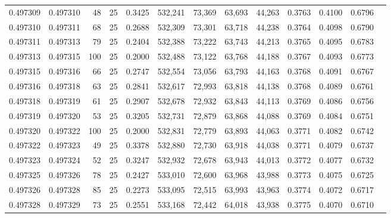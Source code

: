 \begin{tabular}{rrrrrrrrrrrrr}
0.497309 & 0.497310 &    48 &  25 &                                     0.3425 & 532,241 &  73,369 &  63,693 &  44,263 & 0.3763 & 0.4100 & 0.6796 \\
0.497310 & 0.497311 &    68 &  25 &                                     0.2688 & 532,309 &  73,301 &  63,718 &  44,238 & 0.3764 & 0.4098 & 0.6790 \\
0.497311 & 0.497313 &    79 &  25 &                                     0.2404 & 532,388 &  73,222 &  63,743 &  44,213 & 0.3765 & 0.4095 & 0.6783 \\
0.497313 & 0.497315 &   100 &  25 &                                     0.2000 & 532,488 &  73,122 &  63,768 &  44,188 & 0.3767 & 0.4093 & 0.6773 \\
0.497315 & 0.497316 &    66 &  25 &                                     0.2747 & 532,554 &  73,056 &  63,793 &  44,163 & 0.3768 & 0.4091 & 0.6767 \\
0.497316 & 0.497318 &    63 &  25 &                                     0.2841 & 532,617 &  72,993 &  63,818 &  44,138 & 0.3768 & 0.4089 & 0.6761 \\
0.497318 & 0.497319 &    61 &  25 &                                     0.2907 & 532,678 &  72,932 &  63,843 &  44,113 & 0.3769 & 0.4086 & 0.6756 \\
0.497319 & 0.497320 &    53 &  25 &                                     0.3205 & 532,731 &  72,879 &  63,868 &  44,088 & 0.3769 & 0.4084 & 0.6751 \\
0.497320 & 0.497322 &   100 &  25 &                                     0.2000 & 532,831 &  72,779 &  63,893 &  44,063 & 0.3771 & 0.4082 & 0.6742 \\
0.497322 & 0.497323 &    49 &  25 &                                     0.3378 & 532,880 &  72,730 &  63,918 &  44,038 & 0.3771 & 0.4079 & 0.6737 \\
0.497323 & 0.497324 &    52 &  25 &                                     0.3247 & 532,932 &  72,678 &  63,943 &  44,013 & 0.3772 & 0.4077 & 0.6732 \\
0.497325 & 0.497326 &    78 &  25 &                                     0.2427 & 533,010 &  72,600 &  63,968 &  43,988 & 0.3773 & 0.4075 & 0.6725 \\
0.497326 & 0.497328 &    85 &  25 &                                     0.2273 & 533,095 &  72,515 &  63,993 &  43,963 & 0.3774 & 0.4072 & 0.6717 \\
0.497328 & 0.497329 &    73 &  25 &                                     0.2551 & 533,168 &  72,442 &  64,018 &  43,938 & 0.3775 & 0.4070 & 0.6710 \\

\end{tabular}
